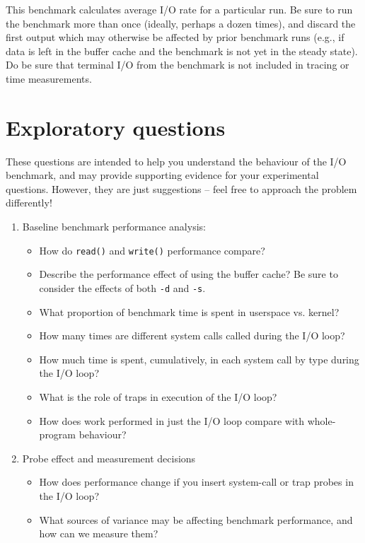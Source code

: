\documentclass[a4paper,10pt]{article}
\begin{document}
This benchmark calculates average I/O rate for a particular run.
Be sure to run the benchmark more than once (ideally, perhaps a dozen times),
and discard the first output which may otherwise be affected by prior
benchmark runs (e.g., if data is left in the buffer cache and the benchmark is
not yet in the steady state).
Do be sure that terminal I/O from the benchmark is not included in tracing or
time measurements.

\section*{Exploratory questions}

These questions are intended to help you understand the behaviour of the I/O
benchmark, and may provide supporting evidence for your experimental
questions.
However, they are just suggestions -- feel free to approach the problem
differently!

\begin{enumerate}
  \item Baseline benchmark performance analysis:
  \begin{itemize}
    \item How do \texttt{read()} and \texttt{write()} performance compare?
    \item Describe the performance effect of using the buffer cache?
      Be sure to consider the effects of both \texttt{-d} and \texttt{-s}.
    \item What proportion of benchmark time is spent in userspace vs. kernel?
    \item How many times are different system calls called during the I/O
      loop?
    \item How much time is spent, cumulatively, in each system call by type
      during the I/O loop?
    \item What is the role of traps in execution of the I/O loop?
    \item How does work performed in just the I/O loop compare with
      whole-program behaviour?
  \end{itemize}
  \item Probe effect and measurement decisions
  \begin{itemize}
    \item How does performance change if you insert system-call or trap probes
      in the I/O loop?
    \item What sources of variance may be affecting benchmark performance,
      and how can we measure them?
  \end{itemize}
\end{enumerate}
\end{document}
